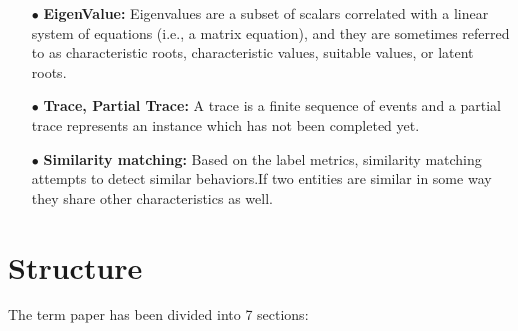 \documentclass[runningheads]{llncs}
\begin{document}
\begin{itemize}
    \item[$\bullet$] \textbf{EigenValue:} Eigenvalues are a subset of scalars correlated with a linear system of equations (i.e., a matrix equation), and they are sometimes referred to as characteristic roots, characteristic values, suitable values, or latent roots.\newline
    
    \item[$\bullet$] \textbf{Trace, Partial Trace:} A trace is a finite sequence of events and a partial trace represents an instance which has not been completed yet.\newline
     \item[$\bullet$] \textbf{Similarity matching:} Based on the label metrics, similarity matching attempts to detect similar behaviors.If two entities are similar in some way they share other characteristics as well.\newline
\end{itemize}


\section{Structure}
The term paper has been divided into 7 sections:
\end{document}
